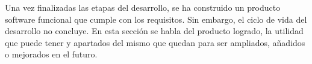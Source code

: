 Una vez finalizadas las etapas del desarrollo, se ha construido un producto software funcional que cumple con los requisitos. Sin embargo, el ciclo de vida del desarrollo no concluye. En esta sección se habla del producto logrado, la utilidad que puede tener y apartados del mismo que quedan para ser ampliados, añadidos o mejorados en el futuro.
